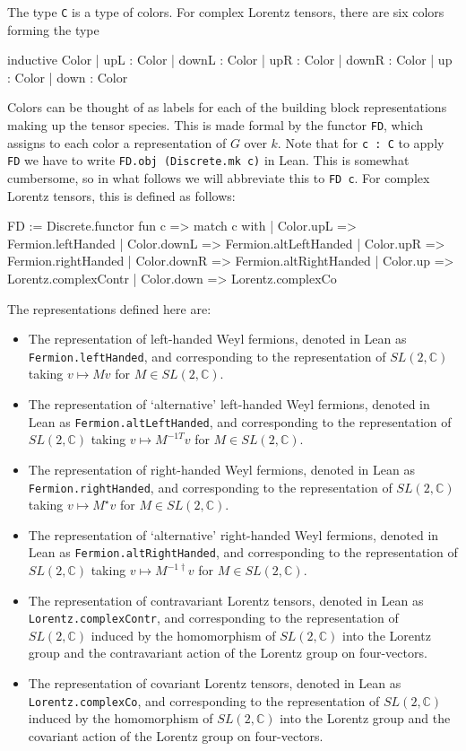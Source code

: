 \documentclass[a4paper, 11pt]{article}
\begin{document}
The type \lstinline|C| is a type of colors.
For complex Lorentz tensors, there are six colors forming the type 
\begin{code}
inductive Color
  | upL : Color
  | downL : Color
  | upR : Color
  | downR : Color
  | up : Color
  | down : Color
\end{code}
Colors can be thought of as labels for each of the building 
block representations making up the tensor species.  This is made formal by the functor 
\lstinline|FD|, which assigns to each color a representation of $G$ over $k$.
Note that for \lstinline|c : C| to apply \lstinline|FD| we have to write 
\lstinline|FD.obj (Discrete.mk c)| in Lean. This is somewhat cumbersome, so in what 
follows we will abbreviate this to \lstinline|FD c|.
For complex Lorentz tensors, this is defined as follows:
\begin{code}
FD := Discrete.functor fun c =>
  match c with
  | Color.upL => Fermion.leftHanded
  | Color.downL => Fermion.altLeftHanded
  | Color.upR => Fermion.rightHanded
  | Color.downR => Fermion.altRightHanded
  | Color.up => Lorentz.complexContr
  | Color.down => Lorentz.complexCo
\end{code}
The representations defined here are: 
\begin{itemize}
  \item The representation of left-handed Weyl fermions, 
    denoted in Lean as \lstinline|Fermion.leftHanded|, and corresponding to the 
    representation of $SL(2, \mathbb{C})$ taking $v \mapsto M v$ for $M \in SL(2, \mathbb{C})$.
  \item The representation of `alternative' left-handed Weyl fermions, 
    denoted in Lean as \lstinline|Fermion.altLeftHanded|, and corresponding to the 
    representation of $SL(2, \mathbb{C})$ taking $v \mapsto M^{-1 T} v$ for $M \in SL(2, \mathbb{C})$.
  \item The representation of right-handed Weyl fermions, 
    denoted in Lean as \lstinline|Fermion.rightHanded|, and corresponding to the 
    representation of $SL(2, \mathbb{C})$ taking $v \mapsto M^\star v$ for $M \in SL(2, \mathbb{C})$.
  \item The representation of `alternative' right-handed Weyl fermions,
    denoted in Lean as \lstinline|Fermion.altRightHanded|, and corresponding to the 
    representation of $SL(2, \mathbb{C})$ taking $v \mapsto M^{-1 \dagger} v$ for $M \in SL(2, \mathbb{C})$.
  \item The representation of contravariant Lorentz tensors, 
    denoted in Lean as \lstinline|Lorentz.complexContr|, and corresponding to the 
    representation of $SL(2, \mathbb{C})$ induced by the homomorphism of $SL(2, \mathbb{C})$ into 
    the Lorentz group and the contravariant action of the Lorentz group on four-vectors.
  \item The representation of covariant Lorentz tensors,
     denoted in Lean as \lstinline|Lorentz.complexCo|, and corresponding to the 
    representation of $SL(2, \mathbb{C})$ induced by the homomorphism of $SL(2, \mathbb{C})$ into 
    the Lorentz group and the covariant action of the Lorentz group on four-vectors.
\end{itemize}
\end{document}
